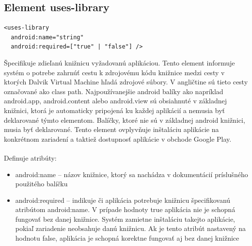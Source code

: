 \subsection{Element uses-library}
\lstset{language=XML}
\begin{lstlisting}
<uses-library
  android:name="string"
  android:required=["true" | "false"] />
\end{lstlisting}
Špecifikuje zdieľanú knižnicu vyžadovanú aplikáciou. Tento element informuje systém o potrebe zahrnúť cestu k zdrojovému kódu knižnice medzi cesty v ktorých Dalvik Virtual Machine hľadá zdrojové súbory. V angličtine sú tieto cesty označované ako class path. Najpoužívanejšie android balíky ako napríklad android.app, android.content alebo android.view sú obsiahnuté v základnej knižnici, ktorá je automaticky pripojená ku každej aplikácií a nemusia byť deklarované týmto elementom. Balíčky, ktoré nie sú v základnej android knižnici, musia byť deklarované.  Tento element ovplyvňuje inštaláciu aplikácie na konkrétnom zariadení a taktiež dostupnosť aplikácie v obchode Google Play.\\\\ Definuje atribúty:\\
\begin{itemize}
\item android:name – názov knižnice, ktorý sa nachádza v dokumentácií príslušného použitého balíčku
\item android:required – indikuje či aplikácia potrebuje knižnicu špecifikovanú atribútom android:name. V prípade hodnoty true aplikácia nie je schopná fungovať bez danej knižnice. Systém zamietne inštaláciu takejto aplikácie, pokiaľ zariadenie neobsahuje danú knižnicu. 	Ak je tento atribút nastavený na hodnotu false, aplikácia je schopná korektne fungovať aj bez danej knižnice
\end{itemize}

